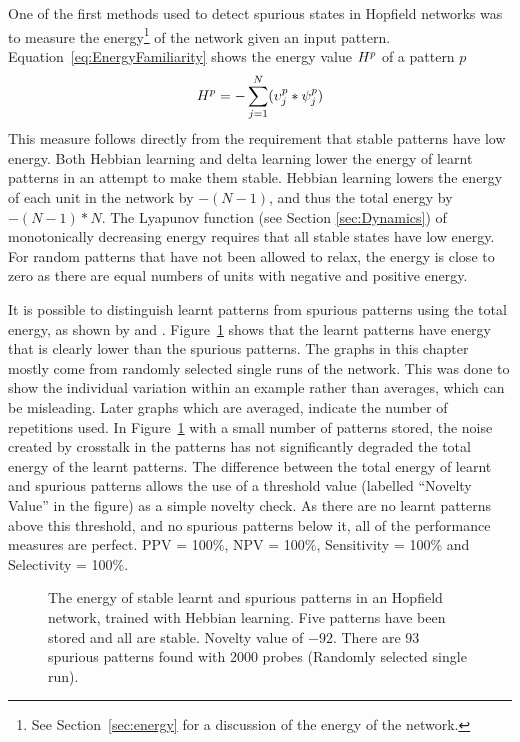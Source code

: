 One of the first methods used to detect spurious states in Hopfield networks was to measure the energy\footnote{See Section~\ref{sec:energy} for a discussion of the energy of the network.}
of the network given an input pattern. Equation~\eqref{eq:EnergyFamiliarity} shows the energy value $H^{p}$ of a pattern $p$
\begin{equation}
 H^{p} = - \sum_{j=1}^{N} (\upsilon_{j}^{p} * \psi_{j}^{p})
 \label{eq:EnergyFamiliarity}
\end{equation}
This measure follows directly from the requirement that stable patterns have low energy.  Both Hebbian learning and delta learning lower the energy of learnt patterns in an attempt to make them stable.  Hebbian learning lowers the energy of each unit in the network by \(-(N-1)\), and thus the total energy by \(-(N-1)*N\).  The Lyapunov function (see Section \ref{sec:Dynamics}) of monotonically decreasing energy requires that all stable states have low energy.  For random patterns that have not been allowed to relax, the energy is close to zero as there are equal numbers of units with negative and positive energy.

It is possible to distinguish learnt patterns from spurious patterns using the total energy, as shown by \citet{Bogacz01a} and \citet{Crook02}. Figure~\ref{fig:PEmeasure} shows that the learnt patterns have energy that is clearly lower than the spurious patterns.  The graphs in this chapter mostly come from randomly selected single runs of the network.  This was done to show the individual variation within an example rather than averages, which can be misleading.  Later graphs which are averaged, indicate the number of repetitions used. In Figure~\ref{fig:PEmeasure} with a small number of patterns stored, the noise created by crosstalk in the patterns has not significantly degraded the total energy of the learnt patterns.  The difference between the total energy of learnt and spurious patterns allows the use of a threshold value (labelled ``Novelty Value'' in the figure) as a simple novelty check. As there are no learnt patterns above this threshold, and no spurious patterns below it, all of the performance measures are perfect. PPV = 100\%, NPV = 100\%, Sensitivity = 100\% and Selectivity = 100\%.



\begin{figure}[tbp]
\center
\small
%	
	\caption{The energy of stable learnt and spurious patterns in an  Hopfield network, trained with Hebbian learning.  Five patterns have been stored and all are stable.  Novelty value of $-92$.  There are 93 spurious patterns found with 2000 probes (Randomly selected single run). }
	\label{fig:PEmeasure}
\end{figure}

